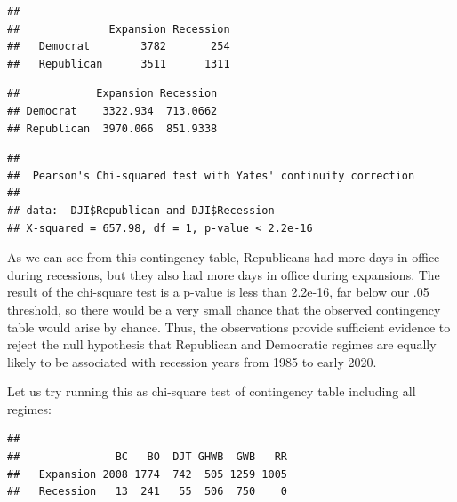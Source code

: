 \documentclass[]{article}
\newenvironment{Shaded}{\begin{snugshade}}{\end{snugshade}}
\newcommand{\CommentTok}[1]{\textcolor[rgb]{0.56,0.35,0.01}{\textit{#1}}}
\newcommand{\KeywordTok}[1]{\textcolor[rgb]{0.13,0.29,0.53}{\textbf{#1}}}
\newcommand{\NormalTok}[1]{#1}
\newcommand{\OperatorTok}[1]{\textcolor[rgb]{0.81,0.36,0.00}{\textbf{#1}}}
\newcommand{\StringTok}[1]{\textcolor[rgb]{0.31,0.60,0.02}{#1}}
\begin{document}
\begin{verbatim}
##             
##              Expansion Recession
##   Democrat        3782       254
##   Republican      3511      1311
\end{verbatim}

\begin{verbatim}
##            Expansion Recession
## Democrat    3322.934  713.0662
## Republican  3970.066  851.9338
\end{verbatim}

\begin{Shaded}
\end{Shaded}

\begin{verbatim}
## 
##  Pearson's Chi-squared test with Yates' continuity correction
## 
## data:  DJI$Republican and DJI$Recession
## X-squared = 657.98, df = 1, p-value < 2.2e-16
\end{verbatim}

As we can see from this contingency table, Republicans had more days in
office during recessions, but they also had more days in office during
expansions. The result of the chi-square test is a p-value is less than
2.2e-16, far below our .05 threshold, so there would be a very small
chance that the observed contingency table would arise by chance. Thus,
the observations provide sufficient evidence to reject the null
hypothesis that Republican and Democratic regimes are equally likely to
be associated with recession years from 1985 to early 2020.

Let us try running this as chi-square test of contingency table
including all regimes:

\begin{Shaded}
\end{Shaded}

\begin{verbatim}
##            
##               BC   BO  DJT GHWB  GWB   RR
##   Expansion 2008 1774  742  505 1259 1005
##   Recession   13  241   55  506  750    0
\end{verbatim}
\end{document}

